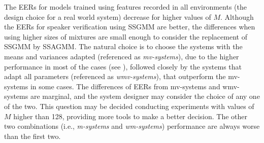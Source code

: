 

The EERs for models trained using features recorded in all environments (the design choice for a real world system) decrease for higher values of $M$. Although the EERs for speaker verification using SSGMM are better, the differences when using higher sizes of mixtures are small enough to consider the replacement of SSGMM by SSAGMM. The natural choice is to choose the systems with the means and variances adapted (referenced as \emph{mv-systems}), due to the higher performance in most of the cases (see ), followed closely by the systems that adapt all parameters (referenced as \emph{wmv-systems}), that outperform the mv-systems in some cases. The differences of EERs from mv-systems and wmv-systems are marginal, and the system designer may consider the choice of any one of the two. This question may be decided conducting experiments with values of $M$ higher than 128, providing more tools to make a better decision. The other two combinations (i.e., \emph{m-systems} and \emph{wm-systems}) performance are always worse than the first two.